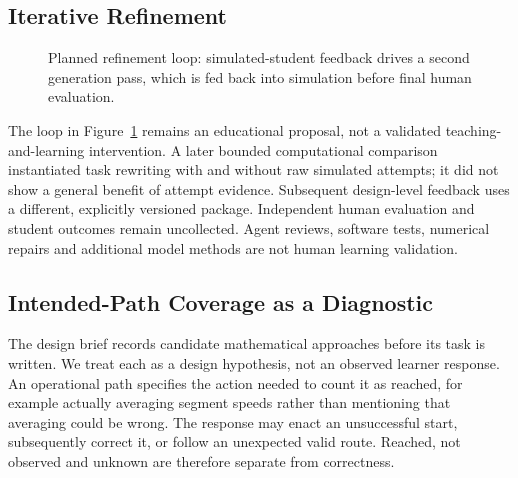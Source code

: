 \subsection{Iterative Refinement}

\begin{figure}[h]
\centering
{}
\caption{Planned refinement loop: simulated-student feedback drives a second generation pass, which is fed back into simulation before final human evaluation.}
\label{fig:refinement-loop}
\end{figure}

The loop in Figure~\ref{fig:refinement-loop} remains an educational proposal, not a validated teaching-and-learning intervention. A later bounded computational comparison instantiated task rewriting with and without raw simulated attempts; it did not show a general benefit of attempt evidence. Subsequent design-level feedback uses a different, explicitly versioned package. Independent human evaluation and student outcomes remain uncollected. Agent reviews, software tests, numerical repairs and additional model methods are not human learning validation.

\subsection{Intended-Path Coverage as a Diagnostic}
\label{sec:path-coverage-method}

The design brief records candidate mathematical approaches before its task is written. We treat each as a design hypothesis, not an observed learner response. An operational path specifies the action needed to count it as reached, for example actually averaging segment speeds rather than mentioning that averaging could be wrong. The response may enact an unsuccessful start, subsequently correct it, or follow an unexpected valid route. Reached, not observed and unknown are therefore separate from correctness.

